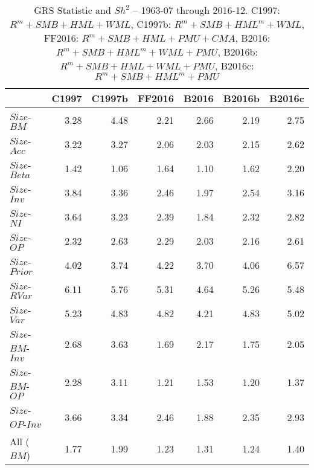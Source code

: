 
\begin{table}[!ht]
\centering
\caption{GRS Statistic and $Sh^2$ -- 1963-07 through 2016-12.
    \scriptsize{C1997: $R^m+SMB+HML+WML$,
                C1997b: $R^m+SMB+HML^m+WML$,
                FF2016: $R^m+SMB+HML+PMU+CMA$,
                B2016: $R^m+SMB+HML^m+WML+PMU$,
                B2016b: $R^m+SMB+HML+WML+PMU$,
                B2016c: $R^m+SMB+HML^m+PMU$}}
\begin{tabular}{lrrrrrr}
  \toprule
     & C1997  & C1997b  & FF2016  & B2016  & B2016b  & B2016c  \\
  \midrule
  
    $Size$-$BM$  & 3.28  & 4.48  & 2.21  & 2.66  & 2.19  & 2.75  \\
  
    $Size$-$Acc$  & 3.22  & 3.27  & 2.06  & 2.03  & 2.15  & 2.62  \\
  
    $Size$-$Beta$  & 1.42  & 1.06  & 1.64  & 1.10  & 1.62  & 2.20  \\
  
    $Size$-$Inv$  & 3.84  & 3.36  & 2.46  & 1.97  & 2.54  & 3.16  \\
  
    $Size$-$NI$  & 3.64  & 3.23  & 2.39  & 1.84  & 2.32  & 2.82  \\
  
    $Size$-$OP$  & 2.32  & 2.63  & 2.29  & 2.03  & 2.16  & 2.61  \\
  
    $Size$-$Prior$  & 4.02  & 3.74  & 4.22  & 3.70  & 4.06  & 6.57  \\
  
    $Size$-$RVar$  & 6.11  & 5.76  & 5.31  & 4.64  & 5.26  & 5.48  \\
  
    $Size$-$Var$  & 5.23  & 4.83  & 4.82  & 4.21  & 4.83  & 5.02  \\
  
    $Size$-$BM$-$Inv$  & 2.68  & 3.63  & 1.69  & 2.17  & 1.75  & 2.05  \\
  
    $Size$-$BM$-$OP$  & 2.28  & 3.11  & 1.21  & 1.53  & 1.20  & 1.37  \\
  
    $Size$-$OP$-$Inv$  & 3.66  & 3.34  & 2.46  & 1.88  & 2.35  & 2.93  \\
    [1em]
    All ($BM$)  & 1.77  & 1.99  & 1.23  & 1.31  & 1.24  & 1.40  \\
  

\end{tabular}
\end{table}
